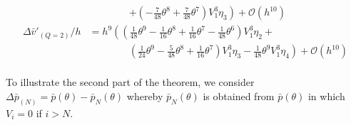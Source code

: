 \begin{align*}
                            & \qquad\qquad \left. + \left(-\frac{7}{48} \theta^{8} + \frac{7}{48} \theta^{7}\right) V_{1}^{3} \eta_{3}\right) + \mathcal{O}(h^{10})                                                                                                    \\
  \Delta \bar{v}'_{(Q=2)}/h & = h^{9}\left(\left(\frac{1}{48} \theta^{9} - \frac{1}{16} \theta^{8} + \frac{1}{16} \theta^{7} - \frac{1}{48} \theta^{6}\right) V_{1}^{3} \eta_{2} + \right.                                                                             \\
                            & \qquad\qquad \left. \left(\frac{1}{24} \theta^{9} - \frac{5}{48} \theta^{8} + \frac{1}{16} \theta^{7}\right) V_{1}^{3} \eta_{3} -\frac{1}{48} \theta^{9} V_{1}^{3} \eta_{4}\right) + \mathcal{O}(h^{10})                                 \\
\end{align*}

To illustrate the second part of the theorem, we consider $\Delta \bar{p}_{(N)} = \bar{p}(\theta) - \bar{p}_N(\theta)$  whereby $\bar{p}_N(\theta)$ is obtained from
$\bar{p}(\theta)$ in which $V_i = 0$ if $i > N$.

